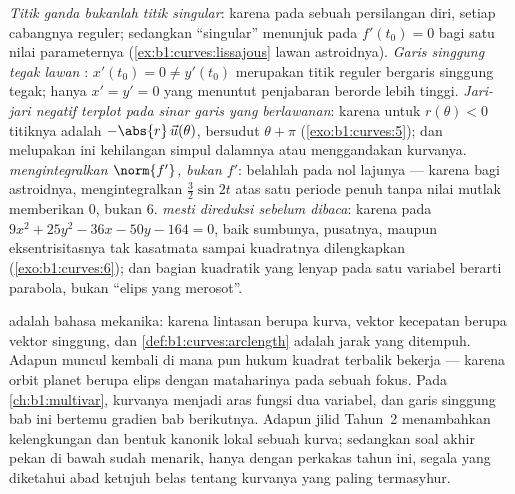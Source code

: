 \begin{remark}
\label{rem:b1:curves:pitfalls}
\emph{Titik ganda bukanlah titik singular}: karena pada sebuah
persilangan diri, setiap cabangnya reguler; sedangkan ``singular'' menunjuk pada
$f'(t_0) = 0$ bagi satu nilai parameternya
(\cref{ex:b1:curves:lissajous} lawan  astroidnya).
\emph{Garis singgung tegak lawan }: $x'(t_0) = 0 \neq y'(t_0)$
merupakan titik reguler bergaris singgung tegak; hanya $x' = y' = 0$
yang menuntut penjabaran berorde lebih tinggi.
\emph{Jari-jari negatif terplot pada sinar garis yang berlawanan}: karena untuk $r(\theta) <
0$ titiknya adalah $-\abs{r}\,\vec u(\theta)$, bersudut $\theta +
\pi$ (\cref{exo:b1:curves:5}); dan melupakan ini kehilangan simpul dalamnya
atau menggandakan kurvanya.
\emph{ mengintegralkan $\norm{f'}$, bukan $f'$}: belahlah
 pada nol lajunya --- karena bagi astroidnya,
mengintegralkan $\frac32\sin 2t$ atas satu periode penuh tanpa nilai
mutlak memberikan $0$, bukan $6$.
\emph{ mesti direduksi sebelum dibaca}: karena pada $9x^2 +
25y^2 - 36x - 50y - 164 = 0$, baik sumbunya, pusatnya, maupun
eksentrisitasnya tak kasatmata sampai kuadratnya dilengkapkan
(\cref{exo:b1:curves:6}); dan bagian kuadratik yang lenyap pada satu
variabel berarti parabola, bukan ``elips yang merosot''.
\end{remark}

\begin{remark}
\label{rem:b1:curves:whereused}
 adalah bahasa mekanika: karena lintasan
berupa kurva, vektor kecepatan berupa vektor singgung, dan  \cref{def:b1:curves:arclength} adalah jarak yang ditempuh. Adapun
 muncul kembali di mana pun hukum kuadrat terbalik bekerja --- karena
orbit planet berupa elips dengan mataharinya pada sebuah fokus. Pada
\cref{ch:b1:multivar}, kurvanya menjadi  aras fungsi
dua variabel, dan garis singgung bab ini bertemu
gradien bab berikutnya. Adapun jilid Tahun~2 menambahkan kelengkungan dan
bentuk kanonik lokal sebuah kurva; sedangkan soal akhir pekan di bawah
sudah menarik, hanya dengan perkakas tahun ini, segala yang
diketahui abad ketujuh belas tentang kurvanya yang paling termasyhur.
\end{remark}

